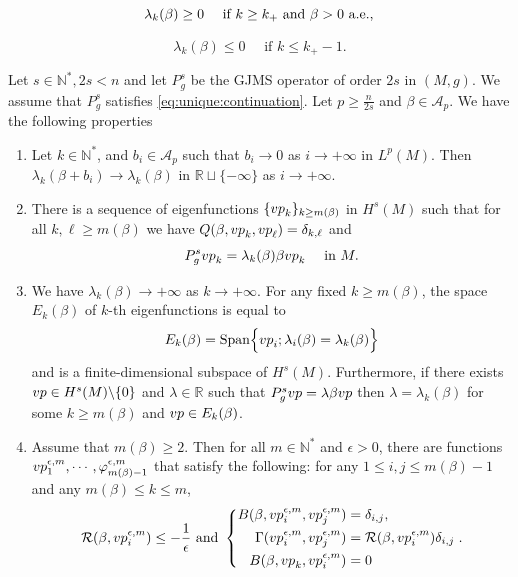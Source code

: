 \documentclass[10pt,a4paper]{amsart}
\newcommand{\N}{\mathbb{N}}
\newcommand{\R}{\mathbb{R}}
\newcommand{\vp}{{\rm vp}}
\begin{document}
\begin{equation} \label{eq:enplus:kplus}
\lambda_k(\beta)  \ge 0 \quad   \text{ if } k \ge k_+ \text{ and } \beta >0 \text{ a.e.},  \\
\end{equation}

\begin{equation} \label{eq:enplus:kmoins}
\lambda_k(\beta)  \le 0 \quad  \text{ if } k \le k_+-1. 
\end{equation}

\begin{prop} \label{prop:deficontinuityeigen} 
Let $s \in \mathbb{N}^*, 2s <n$ and let $P_g^s$ be the GJMS operator of order $2s$ in $(M,g)$. We assume that $P_g^s$ satisfies \eqref{eq:unique:continuation}. Let $p \ge \frac{n}{2s}$ and $\beta \in \mathcal{A}_p$. We have the following properties
\begin{enumerate}
\item Let $k \in \N^*$, and $b_i \in \mathcal{A}_p$ such that $b_i \to 0 $ as $i\to +\infty$ in $L^p(M)$. Then $\lambda_k(\beta+b_i)\to \lambda_k(\beta)$ in $\mathbb{R} \sqcup \{-\infty\}$ as $i\to +\infty$.
\item There is a sequence of eigenfunctions $\{\vp_k \}_{k\geq m(\beta)}$ in $H^s(M)$ such that for all $k, \ell \ge m(\beta)$ we have $Q(\beta,\vp_k,\vp_\ell) = \delta_{k,\ell}$ and
$$ P_g^s \vp_k = \lambda_k(\beta)\beta \vp_k \quad \text{ in } M. $$
\item We have $\lambda_k(\beta) \to +\infty$ as $k\to +\infty$. For any fixed $k \geq m(\beta)$, the space $E_k(\beta)$ of $k$-th eigenfunctions is equal to
$$ E_k(\beta) = \text{Span} \Big \{  \vp_i ; \lambda_i(\beta) = \lambda_k(\beta) \Big \} $$
and is a finite-dimensional subspace of $H^s(M)$. Furthermore, if there exists $\vp \in H^s(M) \backslash \{0\}$ and $\lambda \in \R$ such that $P_g^s \vp = \lambda \beta \vp$ then $\lambda = \lambda_k(\beta)$ for some $k \ge m(\beta)$ and $\vp \in E_k(\beta)$. 
\item Assume that $m(\beta)\geq 2$. Then for all $m\in \N^*$ and $\epsilon >0$, there are functions $\vp_1^{\epsilon,m},\cdots, \varphi_{m(\beta)-1}^{\epsilon,m}$ that satisfy
 the following: for any $ 1 \leq i,j \leq m(\beta)-1$ and any  $m(\beta) \leq k \leq m$,
$$
 \mathcal{R}(\beta,\vp_i^{\epsilon,m})  \leq -\frac{1}{\epsilon} \text{ and } \left \{
 \begin{aligned}
B(\beta,\vp_i^{\epsilon,m},\vp_j^{\epsilon,m}) & = \delta_{i,j}, \\
\Gamma(\vp_i^{\epsilon,m},\vp_j^{\epsilon,m}) & = \mathcal{R}(\beta,\vp_i^{\epsilon,m}) \delta_{i,j} \\
  B(\beta,\vp_k, \vp_i^{\epsilon,m}) & = 0 \\
 \end{aligned}\right. . $$
\end{enumerate}
\end{prop}
\end{document}
